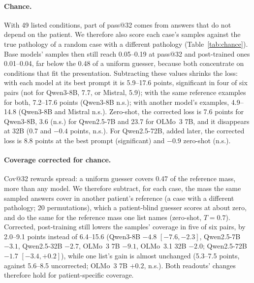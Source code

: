 \documentclass[wcp]{jmlr}
\begin{document}
\paragraph{Chance.} With 49 listed conditions, part of pass@32 comes from answers that do not depend on the patient. We therefore also score each case's samples against the true pathology of a random case with a different pathology (Table~\ref{tab:chance}). Base models' samples then still reach 0.05--0.19 at pass@32 and post-trained ones 0.01--0.04, far below the 0.48 of a uniform guesser, because both concentrate on conditions that fit the presentation. Subtracting these values shrinks the loss: with each model at its best prompt it is 5.9--17.6 points, significant in four of six pairs (not for Qwen3-8B, 7.7, or Mistral, 5.9); with the same reference examples for both, 7.2--17.6 points (Qwen3-8B n.s.); with another model's examples, 4.9--14.8 (Qwen3-8B and Mistral n.s.). Zero-shot, the corrected loss is 7.6 points for Qwen3-8B, 3.6 (n.s.) for Qwen2.5-7B and 23.7 for OLMo~3 7B, and it disappears at 32B (0.7 and $-0.4$ points, n.s.). For Qwen2.5-72B, added later, the corrected loss is 8.8 points at the best prompt (significant) and $-0.9$ zero-shot (n.s.).

\paragraph{Coverage corrected for chance.} Cov@32 rewards spread: a uniform guesser covers 0.47 of the reference mass, more than any model. We therefore subtract, for each case, the mass the same sampled answers cover in another patient's reference (a case with a different pathology; 20 permutations), which a patient-blind guesser scores at about zero, and do the same for the reference mass one list names (zero-shot, $T{=}0.7$). Corrected, post-training still lowers the samples' coverage in five of six pairs, by 2.0--9.1 points instead of 6.4--15.6 (Qwen3-8B $-4.8$ $[-7.6,-2.3]$, Qwen2.5-7B $-3.1$, Qwen2.5-32B $-2.7$, OLMo~3 7B $-9.1$, OLMo~3.1 32B $-2.0$; Qwen2.5-72B $-1.7$ $[-3.4,+0.2]$), while one list's gain is almost unchanged (5.3--7.5 points, against 5.6--8.5 uncorrected; OLMo~3 7B $+0.2$, n.s.). Both readouts' changes therefore hold for patient-specific coverage.
\end{document}
